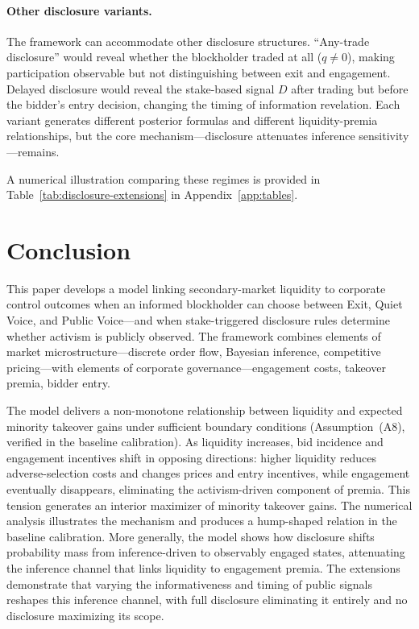 \documentclass[11pt]{article}
\newcommand{\1}{\mathbf{1}}
\begin{document}
\paragraph{Other disclosure variants.}
The framework can accommodate other disclosure structures. ``Any-trade disclosure'' would reveal whether the blockholder traded at all ($q\neq0$), making participation observable but not distinguishing between exit and engagement. Delayed disclosure would reveal the stake-based signal $D$ after trading but before the bidder's entry decision, changing the timing of information revelation. Each variant generates different posterior formulas and different liquidity-premia relationships, but the core mechanism---disclosure attenuates inference sensitivity---remains.

A numerical illustration comparing these regimes is provided in Table~\ref{tab:disclosure-extensions} in Appendix~\ref{app:tables}.

\section{Conclusion}
\label{sec:conclusion}

This paper develops a model linking secondary-market liquidity to corporate control outcomes when an informed blockholder can choose between Exit, Quiet Voice, and Public Voice---and when stake-triggered disclosure rules determine whether activism is publicly observed. The framework combines elements of market microstructure---discrete order flow, Bayesian inference, competitive pricing---with elements of corporate governance---engagement costs, takeover premia, bidder entry.

The model delivers a non-monotone relationship between liquidity and expected minority takeover gains under sufficient boundary conditions (Assumption~\textup{(A8)}, verified in the baseline calibration). As liquidity increases, bid incidence and engagement incentives shift in opposing directions: higher liquidity reduces adverse-selection costs and changes prices and entry incentives, while engagement eventually disappears, eliminating the activism-driven component of premia. This tension generates an interior maximizer of minority takeover gains. The numerical analysis illustrates the mechanism and produces a hump-shaped relation in the baseline calibration. More generally, the model shows how disclosure shifts probability mass from inference-driven to observably engaged states, attenuating the inference channel that links liquidity to engagement premia. The extensions demonstrate that varying the informativeness and timing of public signals reshapes this inference channel, with full disclosure eliminating it entirely and no disclosure maximizing its scope.
\end{document}
